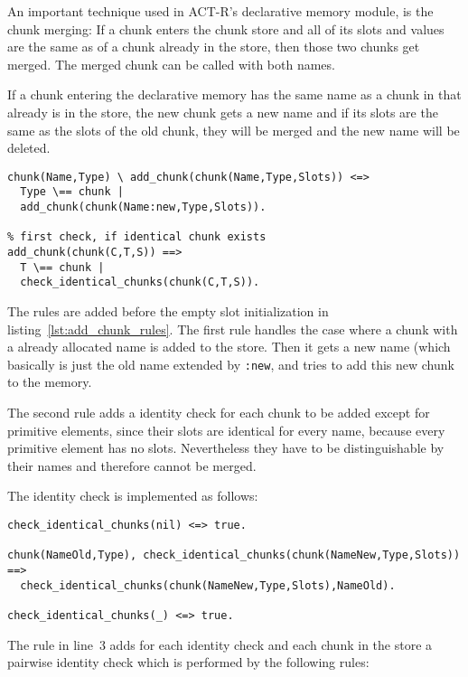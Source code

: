 An important technique used in ACT-R's declarative memory module, is the chunk merging: If a chunk enters the chunk store and all of its slots and values are the same as of a chunk already in the store, then those two chunks get merged. The merged chunk can be called with both names.

If a chunk entering the declarative memory has the same name as a chunk in that already is in the store, the new chunk gets a new name and if its slots are the same as the slots of the old chunk, they will be merged and the new name will be deleted.

\begin{lstlisting}
chunk(Name,Type) \ add_chunk(chunk(Name,Type,Slots)) <=>
  Type \== chunk |
  add_chunk(chunk(Name:new,Type,Slots)).

% first check, if identical chunk exists
add_chunk(chunk(C,T,S)) ==> 
  T \== chunk | 
  check_identical_chunks(chunk(C,T,S)).
\end{lstlisting}

The rules are added before the empty slot initialization in listing~\ref{lst:add_chunk_rules}. The first rule handles the case where a chunk with a already allocated name is added to the store. Then it gets a new name (which basically is just the old name extended by \verb|:new|, and tries to add this new chunk to the memory. 

The second rule adds a identity check for each chunk to be added except for primitive elements, since their slots are identical for every name, because every primitive element has no slots. Nevertheless they have to be distinguishable by their names and therefore cannot be merged.

The identity check is implemented as follows:

\begin{lstlisting}
check_identical_chunks(nil) <=> true.

chunk(NameOld,Type), check_identical_chunks(chunk(NameNew,Type,Slots)) ==> 
  check_identical_chunks(chunk(NameNew,Type,Slots),NameOld).
  
check_identical_chunks(_) <=> true.
\end{lstlisting}

The rule in line~3 adds for each identity check and each chunk in the store a pairwise identity check which is performed by the following rules:

